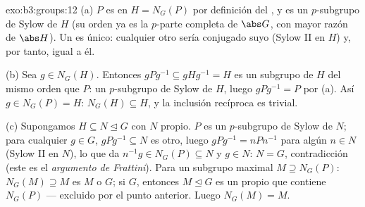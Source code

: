 \begin{solution}{exo:b3:groups:12}
(a) $P$ es  en $H = N_G(P)$ por
definición del , y es un
$p$-subgrupo de Sylow de $H$ (su orden ya es la $p$-parte completa de
$\abs G$, con mayor razón de $\abs H$). Un
 es único: cualquier otro sería
conjugado suyo (Sylow II en $H$) y, por tanto, igual a él.

(b) Sea $g \in N_G(H)$. Entonces $gPg^{-1} \subseteq gHg^{-1} = H$ es un
subgrupo de $H$ del mismo orden que $P$: un $p$-subgrupo de Sylow de
$H$, luego $gPg^{-1} = P$ por (a). Así $g \in
N_G(P) = H$: $N_G(H) \subseteq H$, y la inclusión recíproca es trivial.

(c) Supongamos $H \subseteq N \trianglelefteq G$ con $N$ propio. $P$ es
un $p$-subgrupo de Sylow de $N$; para cualquier $g \in G$,
$gPg^{-1} \subseteq N$ es otro, luego $gPg^{-1} = nPn^{-1}$ para algún
$n \in N$ (Sylow II en $N$), lo que da $n^{-1}g \in N_G(P)
\subseteq N$ y $g \in N$: $N = G$, contradicción (este es el
\emph{argumento de Frattini}). Para un subgrupo maximal $M \supseteq
N_G(P)$: $N_G(M) \supseteq M$ es $M$ o $G$; si $G$, entonces
$M \trianglelefteq G$ es un  propio que contiene $N_G(P)$ --- excluido por el punto anterior.
Luego
$N_G(M) = M$.
\end{solution}

